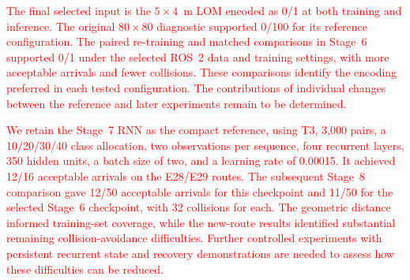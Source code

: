 \documentclass[robotics,article,submit,pdftex,moreauthors]{Definitions/mdpi}
\begin{document}
\textcolor{red}{The final selected input is the $5\times4$~m LOM encoded as 0/1 at both training and inference. The original $80\times80$ diagnostic supported 0/100 for its reference configuration. The paired re-training and matched comparisons in Stage~6 supported 0/1 under the selected ROS~2 data and training settings, with more acceptable arrivals and fewer collisions. These comparisons identify the encoding preferred in each tested configuration. The contributions of individual changes between the reference and later experiments remain to be determined.}

\textcolor{red}{We retain the Stage~7 RNN as the compact reference, using T3, 3,000 pairs, a 10/20/30/40 class allocation, two observations per sequence, four recurrent layers, 350 hidden units, a batch size of two, and a learning rate of 0.00015. It achieved 12/16 acceptable arrivals on the E28/E29 routes. The subsequent Stage~8 comparison gave 12/50 acceptable arrivals for this checkpoint and 11/50 for the selected Stage~6 checkpoint, with 32 collisions for each. The geometric distance informed training-set coverage, while the new-route results identified substantial remaining collision-avoidance difficulties. Further controlled experiments with persistent recurrent state and recovery demonstrations are needed to assess how these difficulties can be reduced.}










\end{document}
